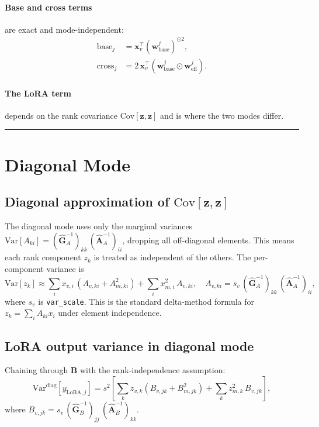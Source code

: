 \documentclass[11pt]{article}
\newcommand{\Var}{\mathrm{Var}}
\newcommand{\Cov}{\mathrm{Cov}}
\begin{document}
\paragraph{Base and cross terms} are exact and mode-independent:
\begin{align}
  \text{base}_j &= \bm x_v^\top (\bm w^j_\text{base})^{\odot 2}, \\
  \text{cross}_j &= 2\,\bm x_v^\top (\bm w^j_\text{base} \odot \bm w^j_\text{eff}).
\end{align}

\paragraph{The LoRA term} depends on the rank covariance $\Cov[\bm z, \bm z]$
and is where the two modes differ.

\bigskip\hrule\bigskip

\section{Diagonal Mode}

\subsection{Diagonal approximation of $\Cov[\bm z, \bm z]$}

The diagonal mode uses only the marginal variances $\Var[A_{ki}]
= (\hat{\bm G}_A^{-1})_{kk}\,(\hat{\bm A}_A^{-1})_{ii}$, dropping all
off-diagonal elements. This means each rank component $z_k$ is treated as
independent of the others. The per-component variance is
\begin{equation}
  \Var[z_k] \approx \sum_i x_{v,i}\,(A_{v,ki} + A_{m,ki}^2)
             + \sum_i x_{m,i}^2\, A_{v,ki}, \quad
  A_{v,ki} = s_v\,(\hat{\bm G}_A^{-1})_{kk}\,(\hat{\bm A}_A^{-1})_{ii},
\end{equation}
where $s_v$ is \texttt{var\_scale}.  This is the standard delta-method formula for
$z_k = \sum_i A_{ki} x_i$ under element independence.

\subsection{LoRA output variance in diagonal mode}

Chaining through $\bm B$ with the rank-independence assumption:
\begin{equation}
  \boxed{
  \Var^{\text{diag}}[y_{\text{LoRA},j}] = s^2\!\left[
    \sum_k z_{v,k}(B_{v,jk} + B_{m,jk}^2)
    + \sum_k z_{m,k}^2\, B_{v,jk}
  \right],
  }
\end{equation}
where $B_{v,jk} = s_v\,(\hat{\bm G}_B^{-1})_{jj}\,(\hat{\bm A}_B^{-1})_{kk}$.
\end{document}

